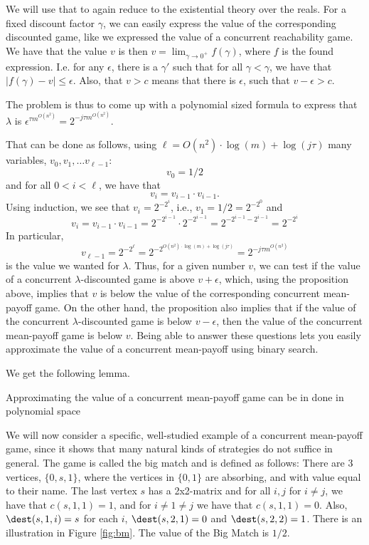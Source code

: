 We will use that to again reduce to the existential theory over the reals. 
For a fixed discount factor $\gamma$, we can easily express the value of the corresponding discounted game, like we expressed the value of a concurrent reachability game.
We have that the value $v$ is then $v=\lim_{\gamma\rightarrow 0^+} f(\gamma)$, where $f$ is the found expression.
I.e. for any $\epsilon$, there is a $\gamma'$ such that for all $\gamma<\gamma$, we have that $|f(\gamma)-v|\leq \epsilon$.
Also, that $v>c$ means that there is $\epsilon$, such that $v-\epsilon>c$.

The problem is thus to come up with a polynomial sized formula to express that $\lambda$ is $\epsilon^{\tau m^{O(n^2)}}=2^{-j \tau m^{O(n^2)}}$.

That can be done as follows, using $\ell=O(n^2)\cdot \log(m)+\log(j\tau)$ many variables, $v_0,v_1,\dots v_{\ell-1}$:
\[
v_0=1/2
\]
and for all $0<i< \ell$, we have that
\[
v_i=v_{i-1}\cdot v_{i-1}.
\]
Using induction, we see that $v_i=2^{-2^{i}}$, i.e., $v_1=1/2=2^{-2^0}$ and \[
v_i=v_{i-1}\cdot v_{i-1}=2^{-2^{i-1}}\cdot 2^{-2^{i-1}}=2^{-2^{i-1}-2^{i-1}}=2^{-2^{i}}\]
In particular, \[
v_{\ell-1}=2^{-2^{\ell}}=2^{-2^{O(n^2)\cdot \log(m)+\log(j\tau)}}=2^{-j\tau m^{O(n^2)}}
\] is the value we wanted for $\lambda$.
Thus, for a given number $v$, we can test if the value of a concurrent  $\lambda$-discounted game is above $v+\epsilon$, which, using the proposition above, implies that $v$ is below the value of the corresponding concurrent mean-payoff game. On the other hand, the proposition also implies that if the value of the concurrent  $\lambda$-discounted game is below $v-\epsilon$, then the value of the concurrent mean-payoff game is below $v$. Being able to answer these questions lets you easily approximate the value of a concurrent mean-payoff using binary search. 

We get the following lemma.
\begin{lemma}
Approximating the value of a concurrent mean-payoff game can be in done in polynomial space
\end{lemma}



We will now consider a specific, well-studied example of a concurrent mean-payoff game, since it shows that many natural kinds of strategies do not suffice in general.
The game is called the big match and is defined as follows:
There are 3 vertices, $\{0,s,1\}$, where the vertices in $\{0,1\}$ are absorbing, and with value equal to their name.
The last vertex $s$ has a 2x2-matrix and for all $i,j$ for $i\neq j$, we have that 
$c(s,1,1)=1$, and for $i\neq 1\neq j$ we have that $c(s,1,1)=0$.
Also,  $\dest(s,1,i)=s$ for each $i$, $\dest(s,2,1)=0$ and $\dest(s,2,2)=1$. There is an illustration in Figure \ref{fig:bm}.
The value of the Big Match is $1/2$.

